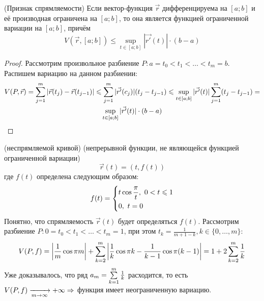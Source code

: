 \begin{lemma} (Признак спрямляемости)
	Если вектор-функция $\vec{r}$ дифференцируема на $[a; b]$ и её производная ограничена на $[a; b]$, то она является функцией ограниченной вариации на $[a; b]$, причём
	\[
		V(\vec{r}, [a; b]) \le \sup\limits_{t \in [a; b]} |\vec{r'}(t)| \cdot (b - a)
	\]
\end{lemma}

\begin{proof}
	Рассмотрим произвольное разбиение $P: a = t_0 < t_1 < \ldots < t_m = b$. Распишем вариацию на данном разбиении:
	\begin{multline*}
		V(P, \vec{r}) = \sum\limits_{j = 1}^m |\vec{r}(t_j) - \vec{r}(t_{j - 1})| \leqslant \sum\limits_{j = 1}^m |\vec{r'}(c_j)|(t_j - t_{j - 1}) \leqslant \sup\limits_{t \in [a; b]} |\vec{r'}(t)| \sum\limits_{j = 1}^m (t_j - t_{j - 1}) =
		\\
		\sup\limits_{t \in [a; b]} |\vec{r'}(t)| \cdot (b - a)
	\end{multline*}
\end{proof}

\begin{example} (неспрямляемой кривой) (непрерывной функции, не являющейся функцией ограниченной вариации)
	\[
		\vec{r}(t) = (t, f(t))
	\]
	где $f(t)$ определена следующим образом:
	\[
		f(t) = \left\{\begin{aligned}
			&{t\cos \frac{\pi}{t},\ 0 < t \leqslant 1}
			\\
			&{0,\ t = 0}
		\end{aligned}\right.
	\]
	Понятно, что спрямляемость $\vec{r}(t)$ будет определяться $f(t)$. Рассмотрим разбиение $P: 0 = t_0 < t_1 < \ldots < t_m = 1$, при этом $t_k = \frac{1}{m + 1 - k}, k \in \{0, \ldots, m\}$:
	\[
		V(P, f) = \left|\frac{1}{m} \cos \pi m\right| + \sum\limits_{k = 2}^m \left|\frac{1}{k}\cos \pi k - \frac{1}{k - 1} \cos \pi (k - 1)\right| = 1 + 2\sum\limits_{k = 2}^m \frac{1}{k}
	\]
	Уже доказывалось, что ряд $a_m = \sum\limits_{k = 1}^m \frac{1}{k}$ расходится, то есть $V(P, f) \xrightarrow[m \to \infty]{} +\infty \Rightarrow$ функция имеет неограниченную вариацию.
\end{example}